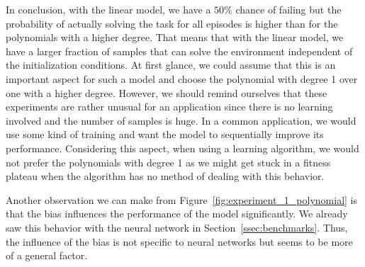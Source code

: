 In conclusion, with the linear model, we have a $50 \%$ chance of failing but the probability of actually solving the task for all episodes is higher than for the polynomials with a higher degree. That means that with the linear model, we have a larger fraction of samples that can solve the environment independent of the initialization conditions. At first glance, we could assume that this is an important aspect for such a model and choose the polynomial with degree 1 over one with a higher degree. However, we should remind ourselves that these experiments are rather unusual for an application since there is no learning involved and the number of samples is huge. In a common application, we would use some kind of training and want the model to sequentially improve its performance. Considering this aspect, when using a learning algorithm, we would not prefer the polynomials with degree 1 as we might get stuck in a fitness plateau when the algorithm has no method of dealing with this behavior.

Another observation we can make from Figure~\ref{fig:experiment_1_polynomial} is that the bias influences the performance of the model significantly. We already saw this behavior with the neural network in Section~\ref{ssec:benchmarks}. Thus, the influence of the bias is not specific to neural networks but seems to be more of a general factor.


